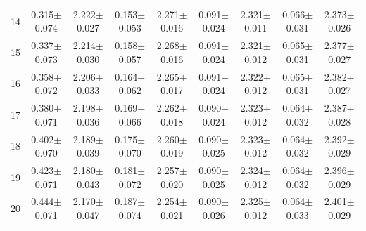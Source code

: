 \begin{table}[H]
{\begin{tabular}{c cc cc cc cc}
14 & 0.315$\pm$0.074 & 2.222$\pm$0.027 & 0.153$\pm$0.053 & 2.271$\pm$0.016 & 0.091$\pm$0.024 & 2.321$\pm$0.011 & 0.066$\pm$0.031 & 2.373$\pm$0.026 \\
15 & 0.337$\pm$0.073 & 2.214$\pm$0.030 & 0.158$\pm$0.057 & 2.268$\pm$0.016 & 0.091$\pm$0.024 & 2.321$\pm$0.012 & 0.065$\pm$0.031 & 2.377$\pm$0.027 \\
16 & 0.358$\pm$0.072 & 2.206$\pm$0.033 & 0.164$\pm$0.062 & 2.265$\pm$0.017 & 0.091$\pm$0.024 & 2.322$\pm$0.012 & 0.065$\pm$0.031 & 2.382$\pm$0.027 \\
17 & 0.380$\pm$0.071 & 2.198$\pm$0.036 & 0.169$\pm$0.066 & 2.262$\pm$0.018 & 0.090$\pm$0.024 & 2.323$\pm$0.012 & 0.064$\pm$0.032 & 2.387$\pm$0.028 \\
18 & 0.402$\pm$0.070 & 2.189$\pm$0.039 & 0.175$\pm$0.070 & 2.260$\pm$0.019 & 0.090$\pm$0.025 & 2.323$\pm$0.012 & 0.064$\pm$0.032 & 2.392$\pm$0.029 \\
19 & 0.423$\pm$0.071 & 2.180$\pm$0.043 & 0.181$\pm$0.072 & 2.257$\pm$0.020 & 0.090$\pm$0.025 & 2.324$\pm$0.012 & 0.064$\pm$0.032 & 2.396$\pm$0.029 \\
20 & 0.444$\pm$0.071 & 2.170$\pm$0.047 & 0.187$\pm$0.074 & 2.254$\pm$0.021 & 0.090$\pm$0.026 & 2.325$\pm$0.012 & 0.064$\pm$0.033 & 2.401$\pm$0.029 \\

\bottomrule

\end{tabular}
}
\end{table}
